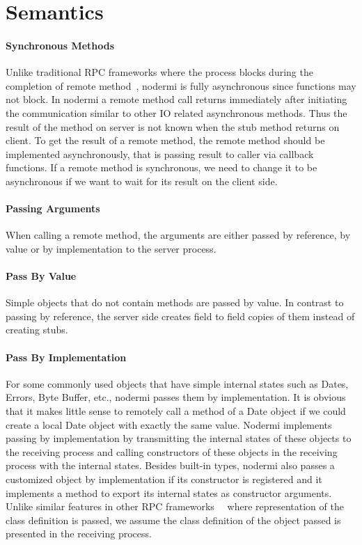 \section{Semantics}

\nodermiexamplefig{}

\paragraph{Synchronous Methods}
Unlike traditional RPC frameworks where the process blocks during the
completion of remote method~\cite{birrell1984implementing},
nodermi is fully asynchronous since \js{} functions may not block.
In nodermi a remote method call returns immediately after initiating the communication
similar to other IO related asynchronous methods.
Thus the result of the method on server
is not known when the stub method returns on client.
To get the result of a remote method,
the remote method should be implemented asynchronously,
that is passing result to caller via callback functions.
If a remote method is synchronous,
we need to change it to be asynchronous if
we want to wait for its result on the client side.


\paragraph{Passing Arguments}
When calling a remote method, the arguments are either
passed by reference, by value or by implementation to
the server process.

\paragraph{Pass By Value}
Simple objects that do not contain methods
 are passed by value.
In contrast to passing by reference,
the server side creates field to field copies of them instead of creating
stubs.

\paragraph{Pass By Implementation}
For some commonly used objects that have simple
internal states such as Dates, Errors, Byte Buffer, etc.,
nodermi passes them by implementation.
It is obvious that it makes little sense to remotely
call a method of a Date object if we could create
a local Date object with exactly the same value.
Nodermi implements passing by implementation by transmitting the internal
states of these objects to the receiving process and
calling constructors
of these objects in the receiving process with the internal states.
Besides built-in types,
nodermi also passes a customized object by implementation if
its constructor is registered and it implements a method
to export its internal states as constructor arguments.
Unlike similar features
 in other RPC frameworks~\cite{birrell1993distributed}~\cite{j2eedoc}
 where representation of the class definition is passed,
we assume the class definition of the object passed is presented
in the receiving process.



